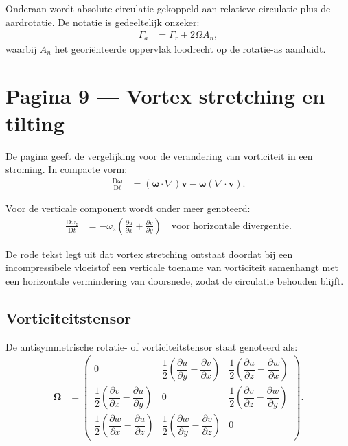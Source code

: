 \documentclass[11pt]{article}
\newcommand{\D}{\mathrm{D}}
\newcommand{\vect}[1]{\mathbf{#1}}
\begin{document}
Onderaan wordt absolute circulatie gekoppeld aan relatieve circulatie plus de aardrotatie. De notatie is gedeeltelijk onzeker:
\begin{align*}
\Gamma_a
  &=
  \Gamma_r
  +2\Omega A_n,
\end{align*}
waarbij $A_n$ het georiënteerde oppervlak loodrecht op de rotatie-as aanduidt.

\section*{Pagina 9 --- Vortex stretching en tilting}

De pagina geeft de vergelijking voor de verandering van vorticiteit in een stroming. In compacte vorm:
\begin{align*}
\frac{\D\bm{\omega}}{\D t}
  &=
  \left(\bm{\omega}\cdot\nabla\right)\vect{v}
  -
  \bm{\omega}\left(\nabla\cdot\vect{v}\right).
\end{align*}

Voor de verticale component wordt onder meer genoteerd:
\begin{align*}
\frac{\D \omega_z}{\D t}
  &=
  -\omega_z
  \left(
  \frac{\partial u}{\partial x}
  +
  \frac{\partial v}{\partial y}
  \right)
  \quad
  \text{voor horizontale divergentie}.
\end{align*}

De rode tekst legt uit dat vortex stretching ontstaat doordat bij een incompressibele vloeistof een verticale toename van vorticiteit samenhangt met een horizontale vermindering van doorsnede, zodat de circulatie behouden blijft.

\subsection*{Vorticiteitstensor}

De antisymmetrische rotatie- of vorticiteitstensor staat genoteerd als:
\begin{align*}
\bm{\Omega}
  &=
  \begin{pmatrix}
  0
  &
  \dfrac{1}{2}
  \left(
  \dfrac{\partial u}{\partial y}
  -
  \dfrac{\partial v}{\partial x}
  \right)
  &
  \dfrac{1}{2}
  \left(
  \dfrac{\partial u}{\partial z}
  -
  \dfrac{\partial w}{\partial x}
  \right)
  \\[1.1em]
  \dfrac{1}{2}
  \left(
  \dfrac{\partial v}{\partial x}
  -
  \dfrac{\partial u}{\partial y}
  \right)
  &
  0
  &
  \dfrac{1}{2}
  \left(
  \dfrac{\partial v}{\partial z}
  -
  \dfrac{\partial w}{\partial y}
  \right)
  \\[1.1em]
  \dfrac{1}{2}
  \left(
  \dfrac{\partial w}{\partial x}
  -
  \dfrac{\partial u}{\partial z}
  \right)
  &
  \dfrac{1}{2}
  \left(
  \dfrac{\partial w}{\partial y}
  -
  \dfrac{\partial v}{\partial z}
  \right)
  &
  0
  \end{pmatrix}.
\end{align*}
\end{document}
